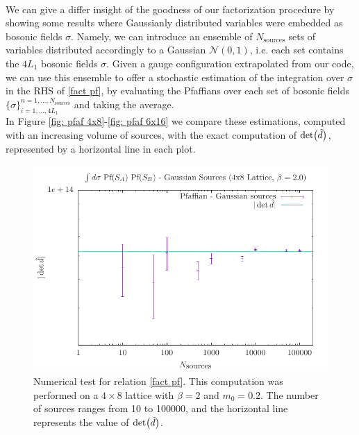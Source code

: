 \\ We can give a differ insight of the goodness of our factorization procedure by showing some results where Gaussianly distributed variables were embedded as bosonic fields $\sigma$. Namely, we can introduce an ensemble of $N_{\textrm{sources}}$ sets of variables distributed accordingly to a Gaussian $\mathcal{N}(0,1)$, i.e. each set contains the $4L_1$ bosonic fields $\sigma$. Given a gauge configuration extrapolated from our code, we can use this ensemble to offer a stochastic estimation of the integration over $\sigma$ in the RHS of \eqref{fact pf}, by evaluating the Pfaffians over each set of bosonic fields $\{\sigma\}_{i = 1, \dots, 4L_1}^{n = 1, \dots, N_{\textrm{sources}}}$ and taking the average. 
\\ In Figure \eqref{fig: pfaf 4x8}-\eqref{fig: pfaf 6x16} we compare these estimations, computed with an increasing volume of sources, with the exact computation of $\det(\Tilde{d})$, represented by a horizontal line in each plot.
\begin{figure}
    \centering
    \includegraphics[width=0.8\linewidth]{images/pfaffian4x8.pdf}
    \caption{Numerical test for relation \eqref{fact pf}. This computation was performed on a $4 \times 8$ lattice with $\beta = 2$ and $m_0 = 0.2$.
    The number of sources ranges from 10 to 100000, and the horizontal line represents the value of $\det(\Tilde{d})$.}
    \label{fig: pfaf 4x8}
\end{figure}
